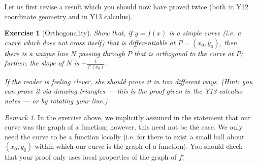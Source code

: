 \documentclass[a4paper,leqno,10pt]{article}
\theoremstyle{exercise}
\newtheorem{Exercise}{Exercise}
\newenvironment{exercise}
  {\begin{mdframed}\begin{Exercise}}
  {\end{Exercise}\end{mdframed}}
\theoremstyle{plain}
\theoremstyle{definition}
\theoremstyle{remark}
\newtheorem*{rem}{Remark}
\begin{document}
Let us first revise a result which you should now have proved twice (both in Y12 coordinate geometry and in Y13 calculus).

\begin{exercise}[Orthogonality]
  Show that, if $ y = f(x) $ is a simple curve (i.e. a curve which does not cross itself) that is differentiable
  at $ P = (x_0, y_0) $, then there is a unique line $ N $ passing through $ P $ that is orthogonal to the curve at $ P $;
  further, the slope of $ N $ is $ -\frac{1}{f'(x_0)} $.

  If the reader is feeling clever, she should prove it in two different ways. (Hint: you can prove it via drawing
  triangles --- this is the proof given in the Y13 calculus notes --- or by rotating your line.)
\end{exercise}

\begin{rem}
  In the exercise above, we implicitly assumed in the statement that our curve was the graph of a function; however, this
  need not be the case. We only need the curve to be a function locally (i.e. for there to exist a small ball about $ (x_0, y_0) $
  within which our curve is the graph of a function). You should check that your proof only uses local properties of the graph of $ f $!
\end{rem}
\end{document}

